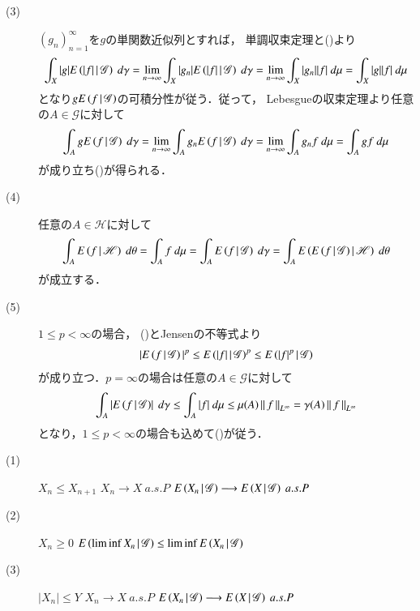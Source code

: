 \begin{prf}
\begin{description}
			\item[(3)]
				$(g_n)_{n=1}^\infty$を$g$の単関数近似列とすれば，
				単調収束定理と()より
				\begin{align}
					\int_X |g|E\left( |f| \, \middle|\, \mathscr{G} \right)\ d\gamma
					= \lim_{n \to \infty} \int_X |g_n|E\left( |f| \, \middle|\, \mathscr{G} \right)\ d\gamma
					= \lim_{n \to \infty} \int_X |g_n||f|\ d\mu
					= \int_X |g||f|\ d\mu
				\end{align}
				となり$gE\left( f \, \middle|\, \mathscr{G} \right)$の可積分性が従う．従って，
				Lebesgueの収束定理より任意の$A \in \mathscr{G}$に対して
				\begin{align}
					\int_A gE\left( f \, \middle|\, \mathscr{G} \right)\ d\gamma
					= \lim_{n \to \infty} \int_A g_nE\left( f \, \middle|\, \mathscr{G} \right)\ d\gamma
					= \lim_{n \to \infty} \int_A g_n f\ d\mu
					= \int_A gf\ d\mu
				\end{align}
				が成り立ち()が得られる．
				
			\item[(4)]
				任意の$A \in \mathscr{H}$に対して
				\begin{align}
					\int_A \cexp{f}{\mathscr{H}}\ d\theta
					= \int_A f\ d\mu
					= \int_A \cexp{f}{\mathscr{G}}\ d\gamma
					= \int_A \cexp{\cexp{f}{\mathscr{G}}}{\mathscr{H}}\ d\theta
				\end{align}
				が成立する．
				
			\item[(5)] 
				$1 \leq p < \infty$の場合，
				()とJensenの不等式より
				\begin{align}
					|E\left( f \, \middle|\, \mathscr{G} \right)|^p \leq E\left( |f| \, \middle|\, \mathscr{G} \right)^p
					\leq E\left( |f|^p \, \middle|\, \mathscr{G} \right)
				\end{align}
				が成り立つ．$p = \infty$の場合は任意の$A \in \mathscr{G}$に対して
				\begin{align}
					\int_A \left| E\left( f \, \middle|\, \mathscr{G} \right) \right|\ d\gamma
					\leq \int_A |f|\ d\mu
					\leq \mu(A) \left\|\, f\, \right\|_{L^\infty}
					= \gamma(A) \left\|\, f\, \right\|_{L^\infty}
				\end{align}
				となり，$1 \leq p < \infty$の場合も込めて()が従う．
				\QED
		\end{description}
	\end{prf}
	
	\begin{screen}
		\begin{thm}
			\begin{description}
				\item[(1)]
					$X_n \leq X_{n+1}$
					$X_n \longrightarrow X\ a.s.P$
					$E\left( X_n \, \middle|\, \mathscr{G} \right) \longrightarrow E\left( X \, \middle|\, \mathscr{G} \right)\ a.s.P$
				\item[(2)]
					$X_n \geq 0$
					$E\left( \liminf X_n \, \middle|\, \mathscr{G} \right) \leq \liminf E\left( X_n \, \middle|\, \mathscr{G} \right)$
				\item[(3)]
					$|X_n| \leq Y$ $X_n \longrightarrow X\ a.s.P$
					$E\left( X_n \, \middle|\, \mathscr{G} \right) \longrightarrow E\left( X \, \middle|\, \mathscr{G} \right)\ a.s.P$
			\end{description}
		\end{thm}
	\end{screen}